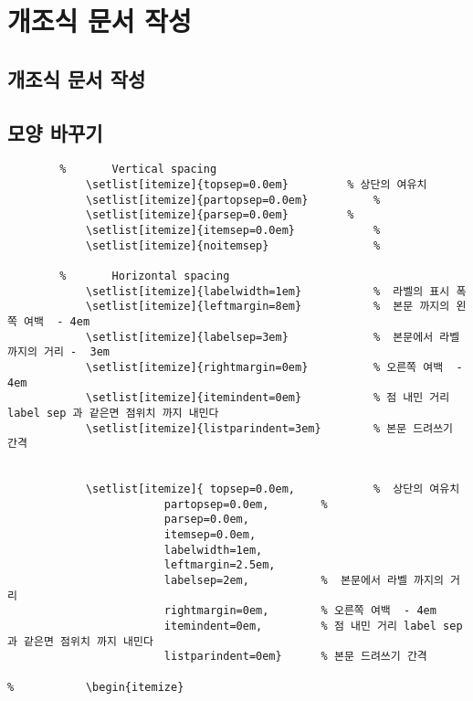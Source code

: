 %

%
	\chapter{개조식 문서 작성}
	\minitoc				%

	\section{개조식 문서 작성}



	\section{모양 바꾸기}


		\begin{mdframed}[style=code_document, frametitle={code}]
			\begin{verbatim}
		%		Vertical spacing
			\setlist[itemize]{topsep=0.0em}			% 상단의 여유치
			\setlist[itemize]{partopsep=0.0em}			% 
			\setlist[itemize]{parsep=0.0em}			% 
			\setlist[itemize]{itemsep=0.0em}			% 
			\setlist[itemize]{noitemsep}				% 
			
		%		Horizontal spacing
			\setlist[itemize]{labelwidth=1em}			%  라벨의 표시 폭
			\setlist[itemize]{leftmargin=8em}			%  본문 까지의 왼쪽 여백  - 4em
			\setlist[itemize]{labelsep=3em} 			%  본문에서 라벨까지의 거리 -  3em
			\setlist[itemize]{rightmargin=0em}			% 오른쪽 여백  - 4em
			\setlist[itemize]{itemindent=0em} 			% 점 내민 거리 label sep 과 같은면 점위치 까지 내민다
			\setlist[itemize]{listparindent=3em}		% 본문 드려쓰기 간격
	
	
			\setlist[itemize]{ topsep=0.0em, 			%  상단의 여유치
						partopsep=0.0em, 		%  
						parsep=0.0em, 
						itemsep=0.0em, 
						labelwidth=1em, 
						leftmargin=2.5em,
						labelsep=2em,			%  본문에서 라벨 까지의 거리
						rightmargin=0em,		% 오른쪽 여백  - 4em
						itemindent=0em, 		% 점 내민 거리 label sep 과 같은면 점위치 까지 내민다
						listparindent=0em}		% 본문 드려쓰기 간격
	
%			\begin{itemize}
			\end{verbatim}
		\end{mdframed}

